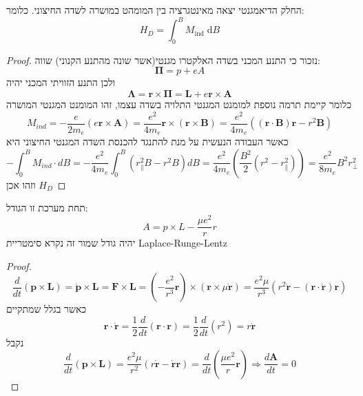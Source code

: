 \documentclass{tstextbook}
\begin{document}
\begin{proposition}
החלק הדיאמגנטי יצאה מאינטגרציה בין המומהט במושרה לשדה החיצוני. כלומר:
$$H_{D}=\int _{0}^{B}M_{\text{ind}} \;\mathrm{d} B $$

\end{proposition}
\begin{proof}
נזכור כי התנע המכני בשדה האלקטרו מגנטי(אשר שונה מהתנע הקנוני) שווה:
$$\mathbf{\Pi}=p+e A$$
ולכן התנע הזוויתי המכני יהיה
$$\mathbf{\Lambda}=\mathbf{r}\times\mathbf{\Pi}=\mathbf{L}+e\mathbf{r}\times\mathbf{A}$$
כלומר קיימת תרמה נוספת למומנט המגנטי התלויה בשדה עצמו, זהו המומנט המגנטי המושרה
$$M_{i n d}=-\frac{e}{2m_{e}}\left(e\mathbf{r}\times\mathbf{A}\right)=\frac{e^{2}}{4m_{e}}\mathbf{r}\times\left(\mathbf{r}\times\mathbf{B}\right)=\frac{e^{2}}{4m_{e}}\left(\left(\mathbf{r}\cdot\mathbf{B}\right)\mathbf{r}-r^{2}\mathbf{B}\right)$$
כאשר העבודה הנעשית על מנת להתנגד להכנסת השדה המגנטי החיצוני היא
$$-\int_{0}^{B}M_{i n d}\cdot d B=-\frac{e^{2}}{4m_{e}}\int_{0}^{B}\left(r_{\parallel}^{2}B-r^{2}B\right)d B=\frac{e^{2}}{4m_{e}}\left(\frac{B^{2}}{2}\left(r^{2}-r_{\parallel}^{2}\right)\right)=\frac{e^{2}}{8m_{e}}B^{2}r_{\perp}^{2}$$
וזהו אכן \(H_{D}\)

\end{proof}
\begin{proposition}
תחת מערכת זו הגודל:
$$A=p\times L-\frac{\mu e^{2}}{r}r$$
יהיה גודל שמור זה נקרא סימטריית Laplace-Runge-Lentz

\end{proposition}
\begin{proof}
$${\frac{d}{d t}}\left(\mathbf{p}\times\mathbf{L}\right)={\dot{\mathbf{p}}}\times\mathbf{L}=\mathbf{F}\times\mathbf{L}=\left(-{\frac{e^{2}}{r^{3}}}\mathbf{r}\right)\times\left(\mathbf{r}\times\mu{\dot{\mathbf{r}}}\right)={\frac{e^{2}\mu}{r^{3}}}\left(r^{2}{\dot{\mathbf{r}}}-\left(\mathbf{r}\cdot{\dot{\mathbf{r}}}\right)\mathbf{r}\right)$$
כאשר בגלל שמתקיים
$$\mathbf{r}\cdot{\dot{\mathbf{r}}}={\frac{1}{2}}{\frac{d}{d t}}\left(\mathbf{r}\cdot\mathbf{r}\right)={\frac{1}{2}}{\frac{d}{d t}}\left(r^{2}\right)=r{\dot{\mathbf{r}}}$$
נקבל
$${\frac{d}{d t}}\left(\mathbf{p}\times\mathbf{L}\right)={\frac{e^{2}\mu}{r^{2}}}\left(r{\dot{\mathbf{r}}}-{\dot{\mathbf{r}}}\mathbf{r}\right)={\frac{d}{d t}}\left({\frac{\mu e^{2}}{r}}\mathbf{r}\right)\Longrightarrow{\frac{d\mathbf{A}}{d t}}=0$$

\end{proof}
\end{document}
